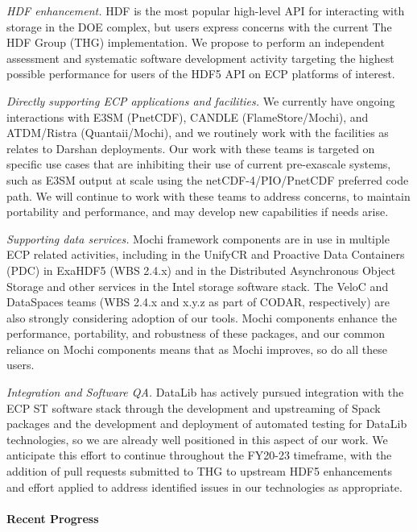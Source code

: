 \emph{HDF enhancement.} HDF is the most popular high-level API for
interacting with storage in the DOE complex, but users express concerns
with the current The HDF Group (THG) implementation. We propose to perform
an independent assessment and systematic software development activity
targeting the highest possible performance for users of the HDF5 API on
ECP platforms of interest.

\emph{Directly supporting ECP applications and facilities.} We currently
have ongoing interactions with E3SM (PnetCDF), CANDLE (FlameStore/Mochi),
and ATDM/Ristra (Quantaii/Mochi), and we routinely work with the
facilities as relates to Darshan deployments. Our work with these
teams is targeted on specific use cases that are inhibiting their use
of current pre-exascale systems, such as E3SM output at scale using the
netCDF-4/PIO/PnetCDF preferred code path. We will continue to work with
these teams to address concerns, to maintain portability and performance,
and may develop new capabilities if needs arise. 

\emph{Supporting data services.} Mochi framework components are in use in
multiple ECP related activities, including in the UnifyCR and Proactive
Data Containers (PDC) in ExaHDF5 (WBS 2.4.x) and in the Distributed
Asynchronous Object Storage and other services in the Intel storage
software stack. The VeloC and DataSpaces teams (WBS 2.4.x and x.y.z as
part of CODAR, respectively) are also strongly considering adoption
of our tools. Mochi components enhance the performance, portability,
and robustness of these packages, and our common reliance on Mochi
components means that as Mochi improves, so do all these users.

\emph{Integration and Software QA.} DataLib has actively pursued
integration with the ECP ST software stack through the development
and upstreaming of Spack packages and the development and deployment
of automated testing for DataLib technologies, so we are already well
positioned in this aspect of our work. We anticipate this effort to
continue throughout the FY20-23 timeframe, with the addition of pull
requests submitted to THG to upstream HDF5 enhancements and effort applied
to address identified issues in our technologies as appropriate.

\paragraph{Recent Progress}

